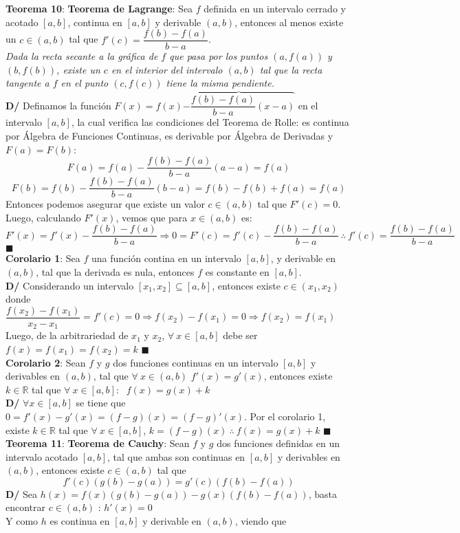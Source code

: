 \documentclass[11pt,a4paper]{article}
\newcommand*{\QEDA}{\null\nobreak\hfill\ensuremath{\blacksquare}}
\begin{document}
\noindent \textbf{Teorema 10}: \textbf{Teorema de Lagrange}: Sea $f$ definida en un intervalo cerrado y acotado $[a,b]$, continua en $[a,b]$ y derivable $(a,b)$, entonces al menos existe un $c\in (a,b)$ tal que $f'(c) = \dfrac{f(b)-f(a)}{b-a}$.\\
\textit{Dada la recta secante a la gr\'afica de $f$ que pasa por los puntos $(a,f(a))$ y $(b,f(b))$, existe un $c$ en el interior del intervalo $(a,b)$ tal que la recta tangente a $f$ en el punto $(c,f(c))$ tiene la misma pendiente.}\\
\noindent \textbf{D/} Definamos la funci\'on $F(x)=f(x) \overbrace{- \dfrac{f(b)-f(a)}{b-a}(x-a)}$ en el intervalo $[a,b]$, la cual verifica las condiciones del Teorema de Rolle: es continua por \'Algebra de Funciones Continuas, es derivable por \'Algebra de Derivadas y $F(a)=F(b)$: 
$$F(a)=f(a)-\dfrac{f(b)-f(a)}{b-a}(a-a) = f(a)$$
$$F(b)=f(b)-\dfrac{f(b)-f(a)}{b-a}(b-a) = f(b)-f(b)+f(a) = f(a)$$
Entonces podemos asegurar que existe un valor $c \in (a,b)$ tal que $F'(c)=0$. Luego, calculando $F'(x)$, vemos que para $x\in(a,b)$ es: $$F'(x) = f'(x)-\dfrac{f(b)-f(a)}{b-a} \Rightarrow 0=F'(c)=f'(c)-\dfrac{f(b)-f(a)}{b-a}\ \therefore\ f'(c)=\dfrac{f(b)-f(a)}{b-a}$$\QEDA\\

\noindent \textbf{Corolario 1}: Sea $f$ una funci\'on contina en un intervalo $[a,b]$, y derivable en $(a,b)$, tal que la derivada es nula, entonces $f$ es constante en $[a,b]$. \\
\textbf{D/} Considerando un intervalo $[x_1,x_2] \subseteq [a,b]$, entonces existe $c\in(x_1,x_2)$ donde $\dfrac{f(x_2)-f(x_1)}{x_2-x_1} = f'(c) = 0 \Rightarrow f(x_2) - f(x_1) = 0 \Rightarrow f(x_2)=f(x_1)$\\
Luego, de la arbitrariedad de $x_1$ y $x_2$, $\forall\ x \in [a,b]$ debe ser $f(x)=f(x_1)=f(x_2)=k$ \QEDA\\

\noindent \textbf{Corolario 2}: Sean $f$ y $g$ dos funciones continuas en un intervalo $[a,b]$ y derivables en $(a,b)$, tal que $\forall\ x \in (a,b)$ $f'(x) = g'(x)$, entonces existe $k \in \mathbb{R}$ tal que $\forall\ x\in[a,b]$: $\ \ f(x) = g(x)+k$\\
\textbf{D/} $\forall x\in[a,b]$ se tiene que $0 = f'(x)-g'(x) = (f-g)(x) = (f-g)'(x)$. Por el corolario 1, existe $k \in \mathbb{R}$ tal que $\forall\ x\in[a,b]$, $k=(f-g)(x)\ \therefore\ f(x)=g(x)+k$ \QEDA\\

\noindent \textbf{Teorema 11}: \textbf{Teorema de Cauchy}: Sean $f$ y $g$ dos funciones definidas en un intervalo acotado $[a,b]$, tal que ambas son continuas en $[a,b]$ y derivables en $(a,b)$, entonces existe $c\in(a,b)$ tal que $$f'(c)(g(b)-g(a)) = g'(c)(f(b)-f(a))$$
\textbf{D/} Sea $h(x)=f(x)(g(b)-g(a))-g(x)(f(b)-f(a))$, basta encontrar $c\in(a,b)$ : $h'(x)=0$\\
Y como $h$ es continua en $[a,b]$ y derivable en $(a,b)$, viendo que 
\end{document}
